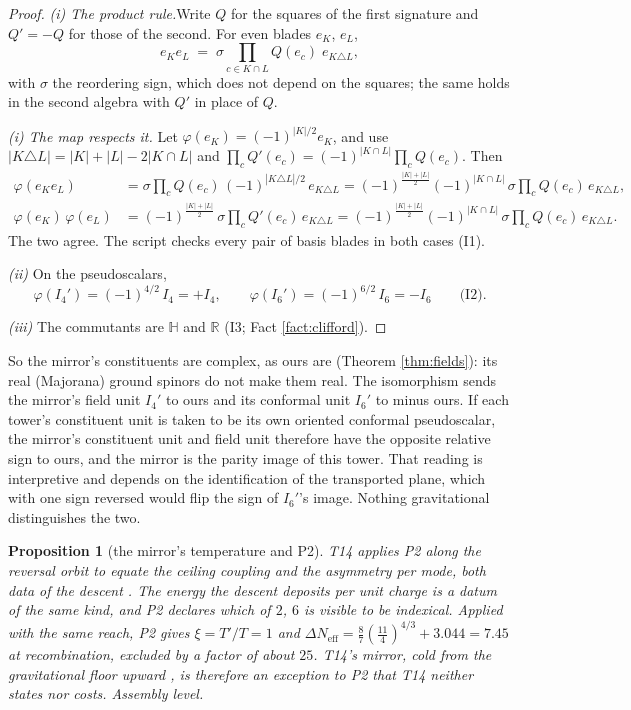 \documentclass[11pt]{article}
\newtheorem{proposition}[theorem]{Proposition}
\theoremstyle{definition}
\newcommand{\R}{\mathbb{R}}
\newcommand{\HH}{\mathbb{H}}
\newcommand{\Neff}{N_{\mathrm{eff}}}
\newcommand{\pstep}[1]{\par\smallskip\noindent\textit{#1.}\enspace}
\newcommand{\pitem}[1]{\par\smallskip\noindent\textit{#1}\enspace}
\begin{document}
\begin{proof}
\textit{(i) The product rule.}\enspace Write $Q$ for the squares of the first signature and $Q' = -Q$ for those of the second. For even blades $e_{K}$, $e_{L}$,
\[
e_{K}e_{L} \;=\; \sigma \prod_{c \in K \cap L}Q(e_{c})\;e_{K \triangle L},
\]
with $\sigma$ the reordering sign, which does not depend on the squares; the same holds in the second algebra with $Q'$ in place of $Q$.

\pstep{(i) The map respects it} Let $\varphi(e_{K}) = (-1)^{|K|/2}e_{K}$, and use $|K \triangle L| = |K| + |L| - 2|K \cap L|$ and $\prod_{c}Q'(e_{c}) = (-1)^{|K \cap L|}\prod_{c}Q(e_{c})$. Then
\begin{align*}
\varphi(e_{K}e_{L}) &= \sigma\prod_{c}Q(e_{c})\,(-1)^{|K \triangle L|/2}\,e_{K \triangle L}
= (-1)^{\frac{|K|+|L|}{2}}(-1)^{|K \cap L|}\,\sigma\prod_{c}Q(e_{c})\,e_{K \triangle L}, \\
\varphi(e_{K})\,\varphi(e_{L}) &= (-1)^{\frac{|K|+|L|}{2}}\,\sigma\prod_{c}Q'(e_{c})\,e_{K \triangle L}
= (-1)^{\frac{|K|+|L|}{2}}(-1)^{|K \cap L|}\,\sigma\prod_{c}Q(e_{c})\,e_{K \triangle L}.
\end{align*}
The two agree. The script checks every pair of basis blades in both cases (I1).

\pitem{(ii)} On the pseudoscalars,
\[
\varphi(I_{4}') = (-1)^{4/2}\,I_{4} = +I_{4}, \qquad \varphi(I_{6}') = (-1)^{6/2}\,I_{6} = -I_{6} \qquad \text{(I2)}.
\]

\pitem{(iii)} The commutants are $\HH$ and $\R$ (I3; Fact \ref{fact:clifford}).
\end{proof}

So the mirror's constituents are complex, as ours are (Theorem \ref{thm:fields}): its real (Majorana) ground spinors do not make them real. The isomorphism sends the mirror's field unit $I_{4}'$ to ours and its conformal unit $I_{6}'$ to minus ours. If each tower's constituent unit is taken to be its own oriented conformal pseudoscalar, the mirror's constituent unit and field unit therefore have the opposite relative sign to ours, and the mirror is the parity image of this tower. That reading is interpretive and depends on the identification of the transported plane, which with one sign reversed would flip the sign of $I_{6}'$'s image. Nothing gravitational distinguishes the two.

\begin{proposition}[the mirror's temperature and P2]\label{prop:P2}
T14 applies P2 along the reversal orbit to equate the ceiling coupling and the asymmetry per mode, both data of the descent \cite[Thm.~4.3(iv), (v)]{ButlerT14}. The energy the descent deposits per unit charge is a datum of the same kind, and P2 declares which of $2$, $6$ is visible to be indexical. Applied with the same reach, P2 gives $\xi = T'/T = 1$ and $\Delta\Neff = \tfrac{8}{7}(\tfrac{11}{4})^{4/3} + 3.044 = 7.45$ at recombination, excluded by a factor of about $25$. T14's mirror, cold from the gravitational floor upward \cite[Prop.~4.6, Prop.~A.2]{ButlerT14}, is therefore an exception to P2 that T14 neither states nor costs. Assembly level.
\end{proposition}
\end{document}
